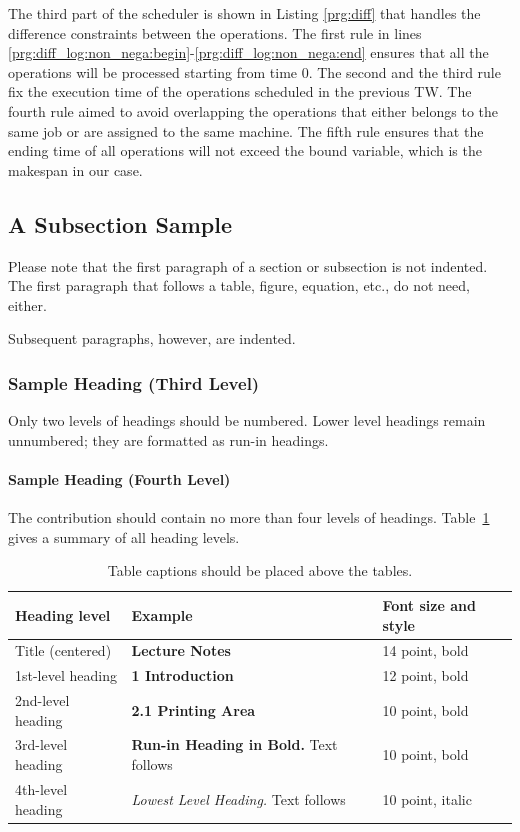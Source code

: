 \documentclass{tlp} %
\begin{document}


The third part of the scheduler is shown in Listing \ref{prg:diff} that handles the difference constraints between the operations. The first rule in lines \ref{prg:diff_log:non_nega:begin}-\ref{prg:diff_log:non_nega:end} ensures that all the operations will be processed starting from time $0$. The second and the third rule fix the execution time of the operations scheduled in the previous TW. The fourth rule aimed to avoid overlapping the operations that either belongs to the same job or are assigned to the same machine. The fifth rule ensures that the ending time of all operations will not exceed the bound variable, which is the makespan in our case. 




\subsection{A Subsection Sample}
Please note that the first paragraph of a section or subsection is
not indented. The first paragraph that follows a table, figure,
equation, etc., do not need, either.

Subsequent paragraphs, however, are indented.

\subsubsection{Sample Heading (Third Level)} Only two levels of
headings should be numbered. Lower level headings remain unnumbered;
they are formatted as run-in headings.

\paragraph{Sample Heading (Fourth Level)}
The contribution should contain no more than four levels of
headings. Table~\ref{tab1} gives a summary of all heading levels.

\begin{table}
\caption{Table captions should be placed above the
tables.}\label{tab1}
\begin{tabular}{|l|l|l|}
\hline
Heading level &  Example & Font size and style\\
\hline
Title (centered) &  {\Large\bfseries Lecture Notes} & 14 point, bold\\
1st-level heading &  {\large\bfseries 1 Introduction} & 12 point, bold\\
2nd-level heading & {\bfseries 2.1 Printing Area} & 10 point, bold\\
3rd-level heading & {\bfseries Run-in Heading in Bold.} Text follows & 10 point, bold\\
4th-level heading & {\itshape Lowest Level Heading.} Text follows & 10 point, italic\\
\hline
\end{tabular}
\end{table}
\end{document}
